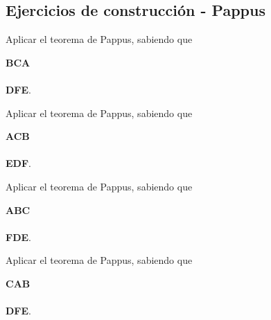 \subsection{Ejercicios de construcción - Pappus}


\begin{section-exercise}
    Aplicar el teorema de Pappus, sabiendo que
    \parbox{40mm}{\textbf{B\hspace{0.4cm}C\hspace{0.4cm}A\\\\ D\hspace{0.4cm}F\hspace{0.4cm}E}.}
    \begin{figure}[H]
        \centering
        
    \end{figure}
\end{section-exercise}
\vspace{-4cm}
\begin{section-exercise}
    Aplicar el teorema de Pappus, sabiendo que
    \parbox{40mm}{\textbf{A\hspace{0.4cm}C\hspace{0.4cm}B\\\\ E\hspace{0.4cm}D\hspace{0.4cm}F}.}
    \begin{figure}[H]
        \centering
        
    \end{figure}
\end{section-exercise}

\begin{section-exercise}
    Aplicar el teorema de Pappus, sabiendo que
    \parbox{40mm}{\textbf{A\hspace{0.4cm}B\hspace{0.4cm}C\\\\ F\hspace{0.4cm}D\hspace{0.4cm}E}.}
    \vspace{-2cm}
    \begin{figure}[H]
        \centering
        
    \end{figure}
    \vspace{-2cm}
\end{section-exercise}

\begin{section-exercise}
    Aplicar el teorema de Pappus, sabiendo que
    \parbox{40mm}{\textbf{C\hspace{0.4cm}A\hspace{0.4cm}B\\\\ D\hspace{0.4cm}F\hspace{0.4cm}E}.}
    \begin{figure}[H]
        \centering
        
    \end{figure}
\end{section-exercise}


